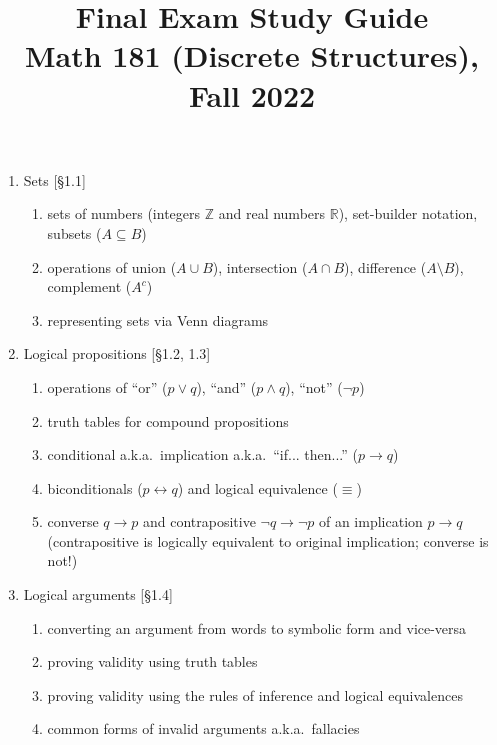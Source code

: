 \documentclass[11pt]{article}
\title{Final Exam Study Guide \\Math 181 (Discrete Structures), Fall 2022}
\date{}
\begin{document}
\maketitle

\vspace{-1.5cm}

\pagestyle{empty}
\thispagestyle{empty}

\begin{enumerate}
\item Sets [\S1.1] 
\begin{enumerate}
\item sets of numbers (integers $\mathbb{Z}$ and real numbers $\mathbb{R}$), set-builder notation, subsets ($A \subseteq B$)
\item operations of union ($A \cup B$), intersection ($A \cap B$), difference ($A \setminus B$), complement ($A^c$)
\item representing sets via Venn diagrams
\end{enumerate}

\item Logical propositions [\S1.2, 1.3]
\begin{enumerate}
\item operations of ``or'' ($p \vee q$), ``and'' ($p \wedge q$), ``not'' ($\neg p$)
\item truth tables for compound propositions 
\item conditional a.k.a.~implication a.k.a.~``if... then...'' ($p \to q$)
\item biconditionals ($p \leftrightarrow q$) and logical equivalence ($\equiv$)
\item converse $q \to p$ and contrapositive $\neg q \to \neg p$ of an implication $p\to q$ \\
(contrapositive is logically equivalent to original implication; converse is not!)
\end{enumerate}

\item Logical arguments [\S1.4]
\begin{enumerate}
\item converting an argument from words to symbolic form and vice-versa
\item proving validity using truth tables
\item proving validity using the rules of inference and logical equivalences
\item common forms of invalid arguments a.k.a.~fallacies
\end{enumerate}


\end{enumerate}
\end{document}
